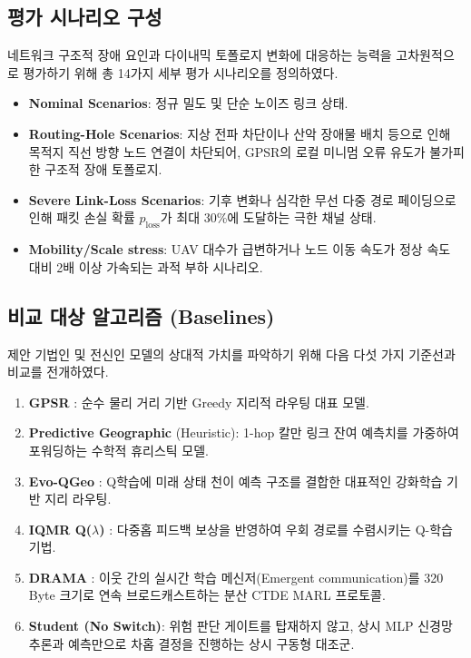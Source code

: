 \subsection{평가 시나리오 구성}
네트워크 구조적 장애 요인과 다이내믹 토폴로지 변화에 대응하는 능력을 고차원적으로 평가하기 위해 총 14가지 세부 평가 시나리오를 정의하였다.
\begin{itemize}
    \item \textbf{Nominal Scenarios}: 정규 밀도 및 단순 노이즈 링크 상태.
    \item \textbf{Routing-Hole Scenarios}: 지상 전파 차단이나 산악 장애물 배치 등으로 인해 목적지 직선 방향 노드 연결이 차단되어, GPSR의 로컬 미니멈 오류 유도가 불가피한 구조적 장애 토폴로지.
    \item \textbf{Severe Link-Loss Scenarios}: 기후 변화나 심각한 무선 다중 경로 페이딩으로 인해 패킷 손실 확률 $p_{\mathrm{loss}}$가 최대 30\%에 도달하는 극한 채널 상태.
    \item \textbf{Mobility/Scale stress}: UAV 대수가 급변하거나 노드 이동 속도가 정상 속도 대비 2배 이상 가속되는 과적 부하 시나리오.
\end{itemize}

\subsection{비교 대상 알고리즘 (Baselines)}
제안 기법인 \method{} 및 전신인 \phaseTwelve{} 모델의 상대적 가치를 파악하기 위해 다음 다섯 가지 기준선과 비교를 전개하였다.
\begin{enumerate}
    \item \textbf{GPSR} \cite{gpsr}: 순수 물리 거리 기반 Greedy 지리적 라우팅 대표 모델.
    \item \textbf{Predictive Geographic} (Heuristic): 1-hop 칼만 링크 잔여 예측치를 가중하여 포워딩하는 수학적 휴리스틱 모델.
    \item \textbf{Evo-QGeo} \cite{evoqgeo}: Q학습에 미래 상태 천이 예측 구조를 결합한 대표적인 강화학습 기반 지리 라우팅.
    \item \textbf{IQMR Q($\lambda$)} \cite{iqmr}: 다중홉 피드백 보상을 반영하여 우회 경로를 수렴시키는 Q-학습 기법.
    \item \textbf{DRAMA} \cite{drama}: 이웃 간의 실시간 학습 메신저(Emergent communication)를 320 Byte 크기로 연속 브로드캐스트하는 분산 CTDE MARL 프로토콜.
    \item \textbf{Student (No Switch)}: 위험 판단 게이트를 탑재하지 않고, 상시 MLP 신경망 추론과 예측만으로 차홉 결정을 진행하는 상시 구동형 대조군.
\end{enumerate}

